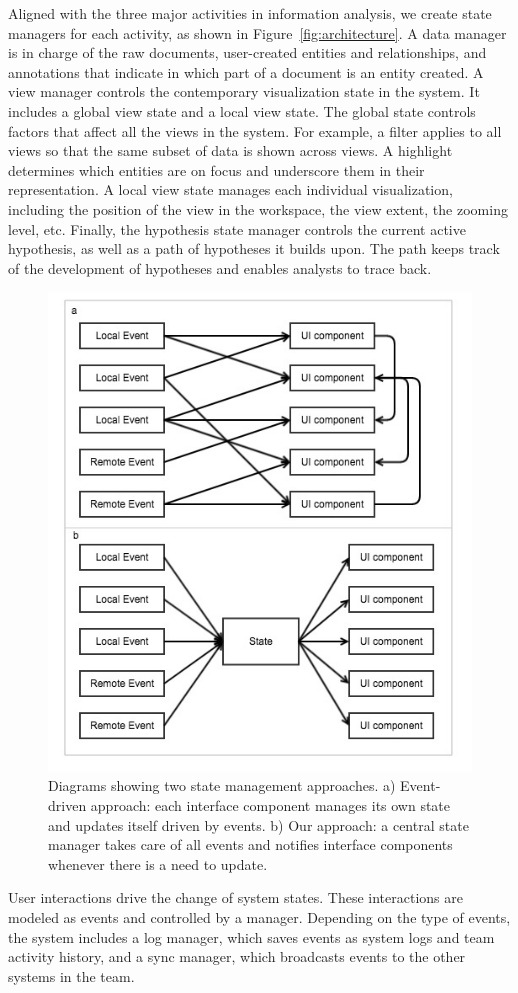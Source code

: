 Aligned with the three major activities in information analysis, we create state managers for each activity, as shown in Figure~\ref{fig:architecture}. A data manager is in charge of the raw documents, user-created entities and relationships, and annotations that indicate in which part of a document is an entity created. A view manager controls the contemporary visualization state in the system. It includes a global view state and a local view state. The global state controls factors that affect all the views in the system. For example, a filter applies to all views so that the same subset of data is shown across views. A highlight determines which entities are on focus and underscore them in their representation. A local view state manages each individual visualization, including the position of the view in the workspace, the view extent, the zooming level, etc. 
Finally, the hypothesis state manager controls the current active hypothesis, as well as a path of hypotheses it builds upon. The path keeps track of the development of hypotheses and enables analysts to trace back. 


\begin{figure}
	\centering
	\includegraphics[width=.4\linewidth]{03-System/img/state_management.jpg}
	\caption{Diagrams showing two state management approaches. a) Event-driven approach: each interface component manages its own state and updates itself driven by events. b) Our approach: a central state manager takes care of all events and notifies interface components whenever there is a need to update.\label{fig:state_management}}
\end{figure}

User interactions drive the change of system states. These interactions are modeled as events and controlled by a manager. Depending on the type of events, the system includes a log manager, which saves events as system logs and team activity history, and a sync manager, which broadcasts events to the other systems in the team. 

